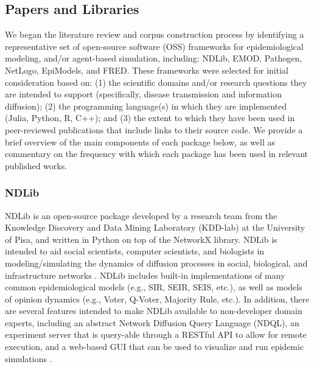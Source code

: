 \documentclass{article}
\begin{document}
\subsection{Papers and Libraries}
We began the literature review and corpus construction process by identifying a representative set of open-source software (OSS) frameworks for epidemiological modeling, and/or agent-based simulation, including: NDLib, EMOD, Pathogen, NetLogo, EpiModels, and FRED. These frameworks were selected for initial consideration based on: (1) the scientific domains and/or research questions they are intended to support (specifically, disease transmission and information diffusion); (2) the programming language(s) in which they are implemented (Julia, Python, R, C++); and (3) the extent to which they have been used in peer-reviewed publications that include links to their source code. We provide a brief overview of the main components of each package below, as well as commentary on the frequency with which each package has been used in relevant published works.


\subsubsection{NDLib}
NDLib is an open-source package developed by a research team from the Knowledge Discovery and Data Mining Laboratory (KDD-lab) at the University of Pisa, and written in Python on top of the NetworkX library. NDLib is intended to aid social scientists, computer scientists, and biologists in modeling/simulating the dynamics of diffusion processes in social, biological, and infrastructure networks \cite{NDlib1, NetworkX}. NDLib includes built-in implementations of many common epidemiological models (e.g., SIR, SEIR, SEIS, etc.), as well as models of opinion dynamics (e.g., Voter, Q-Voter, Majority Rule, etc.). In addition, there are several features intended to make NDLib available to non-developer domain experts, including an abstract Network Diffusion Query Language (NDQL), an experiment server that is query-able through a RESTful API to allow for remote execution, and a web-based GUI that can be used to visualize and run epidemic simulations \cite{NDlib1}. 
\end{document}
